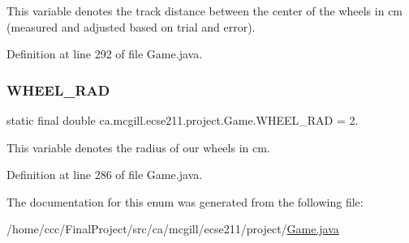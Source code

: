 This variable denotes the track distance between the center of the wheels in cm (measured and adjusted based on trial and error). 

Definition at line 292 of file Game.\+java.

\mbox{\label{enumca_1_1mcgill_1_1ecse211_1_1project_1_1_game_a91bd64670c2a91d006c907142783b1f8}} 
\subsubsection{\texorpdfstring{W\+H\+E\+E\+L\+\_\+\+R\+AD}{WHEEL\_RAD}}
{\footnotesize\ttfamily  static  final double ca.\+mcgill.\+ecse211.\+project.\+Game.\+W\+H\+E\+E\+L\+\_\+\+R\+AD = 2.\hspace{0.3cm}{\ttfamily [static]}}

This variable denotes the radius of our wheels in cm. 

Definition at line 286 of file Game.\+java.



The documentation for this enum was generated from the following file\+:\begin{DoxyCompactItemize}
\item 
/home/ccc/\+Final\+Project/src/ca/mcgill/ecse211/project/\hyperlink{_game_8java}{Game.\+java}\end{DoxyCompactItemize}
